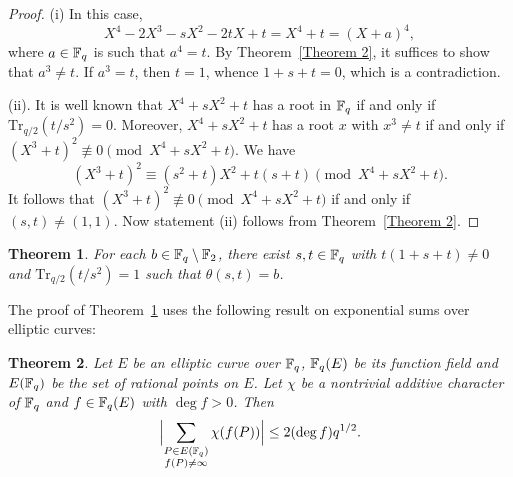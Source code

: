 \documentclass{amsart}
\newtheorem{thm}{Theorem}[section]
\numberwithin{equation}{section}
\theoremstyle{definition}
\newcommand{\f}{\Bbb F}
\begin{document}
\begin{proof}
(i)
In this case, 
\[
X^4-2X^3-sX^2-2tX+t=X^4+t=(X+a)^4,
\]
where $a\in\f_q$ is such that $a^4=t$. By Theorem~\ref{Theorem 2}, it suffices to show that $a^3\ne t$. If $a^3=t$, then $t=1$, whence $1+s+t=0$, which is a contradiction.

\medskip
(ii).
It is well known that $X^4+sX^2+t$ has a root in $\f_q$ if and only if $\text{Tr}_{q/2}(t/s^2)=0$. Moreover, $X^4+sX^2+t$ has a root $x$ with $x^3\ne t$ if and only if $(X^3+t)^2\not\equiv0\pmod{X^4+sX^2+t}$. We have
\[
(X^3+t)^2\equiv(s^2+t)X^2+t(s+t)\pmod{X^4+sX^2+t}.
\]
It follows that $(X^3+t)^2\not\equiv0\pmod{X^4+sX^2+t}$ if and only if $(s,t)\ne (1,1)$. Now statement (ii) follows from Theorem~\ref{Theorem 2}.
\end{proof}

\begin{thm}\label{thm:p=2}
For each $b\in\f_q\setminus\f_2$, there exist $s,t\in\f_q$ with $t(1+s+t)\ne0$ and $\text{Tr}_{q/2}(t/s^2)=1$ such that
$\theta(s,t)=b$.
\end{thm}

The proof of Theorem~\ref{thm:p=2} uses the following result on exponential sums over elliptic curves:

\begin{thm}\cite[Corollary~1]{Kohel-Shparlinski-2000}\label{thm:ellip}
Let $E$ be an elliptic curve over $\f_q$, $\f_q(E)$ be its function field and $E(\f_q)$ be the set of rational points on $E$. Let $\chi$ be a nontrivial additive character of $\f_q$ and $f\in\f_q(E)$ with $\deg f>0$. Then 
\[
\Bigl|\sum_{\substack{P\in E(\f_q)\cr f(P)\ne\infty}}\chi(f(P))\Bigr|\le 2(\deg f)q^{1/2}.
\]
\end{thm}
\end{document}

